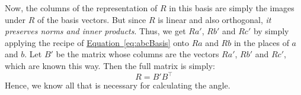 \documentclass{article}
\renewcommand{\eqref}[1]{\hyperref[eq:#1]{Equation~\ref*{eq:#1}}}
\begin{document}
Now, the columns of the representation of $R$ in this basis are simply
the images under $R$ of the basis vectors.  But since $R$ is linear and
also orthogonal, \emph{it preserves norms and inner products}.  Thus,
we get $Ra'$, $Rb'$ and $Rc'$ by simply applying the recipe of
\eqref{abcBasis} onto $Ra$ and $Rb$ in the places of $a$ and $b$.
Let $B'$ be the matrix whose columns are the vectors $Ra'$, $Rb'$ and $Rc'$,
which are known this way.  Then the full matrix is simply:
\begin{equation*}
R = B' B^\top
\end{equation*}
Hence, we know all that is necessary for calculating the angle.
\end{document}
